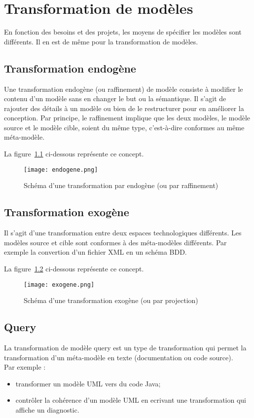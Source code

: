\newpage
\chapter{Transformation de mod{\`e}les}

En fonction des besoins et des projets, les moyens de sp{\'e}cifier les mod{\`e}les sont diff{\'e}rents. Il en est de m{\^e}me pour la transformation de mod{\`e}les.

\section{Transformation endog{\`e}ne}
Une transformation endog{\`e}ne (ou raffinement) de mod{\`e}le consiste {\`a} modifier le contenu d'un mod{\`e}le sans en changer le but ou la s{\'e}mantique. Il s'agit de rajouter des d{\'e}tails {\`a} un mod{\`e}le ou bien de le restructurer pour en am{\'e}liorer la conception. Par principe, le raffinement implique que les deux mod{\`e}les, le mod{\`e}le source et le mod{\`e}le cible, soient du m{\^e}me type, c'est-{\`a}-dire conformes au m{\^e}me m{\'e}ta-mod{\`e}le.

\noindent La figure~\ref{raffinement} ci-dessous repr{\'e}sente ce concept.

\begin{figure}[!ht]
	\centering
	\texttt{[image: endogene.png]}
	\caption{Sch{\'e}ma d'une transformation par endog{\`e}ne (ou par raffinement)}
	\label{raffinement}

\end{figure}

\section{Transformation exog{\`e}ne}
Il s'agit d'une transformation entre deux espaces technologiques diff{\'e}rents. Les mod{\`e}les source et cible sont conformes {\`a} des m{\'e}ta-mod{\`e}les diff{\'e}rents. Par exemple la convertion d'un fichier XML en un sch{\'e}ma BDD.

\noindent La figure~\ref{projection} ci-dessous repr{\'e}sente ce concept.

\begin{figure}[!ht]
	\centering
	\texttt{[image: exogene.png]}
	\caption{Sch{\'e}ma d'une transformation exog{\`e}ne (ou par projection)}
	\label{projection}

\end{figure}

\section{Query}
La transformation de mod{\`e}le query est un type de transformation qui permet la transformation d'un m{\'e}ta-mod{\`e}le en texte (documentation ou code source).\\
Par exemple :
\begin{itemize}
\item transformer un mod{\`e}le UML vers du code Java;
\item contr{\^o}ler la coh{\'e}rence d'un mod{\`e}le UML en ecrivant une transformation qui affiche un diagnostic.
\end{itemize}

